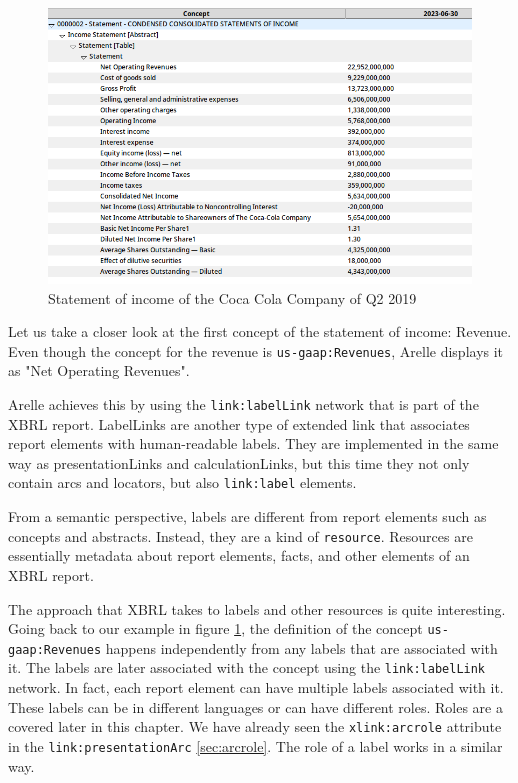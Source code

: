 \begin{figure}[H]
    \centering
    \includegraphics[width=\textwidth]{images/coca_cola_2019_q2.png}
    \caption{Statement of income of the Coca Cola Company of Q2 2019}
    \label{fig:coca_cola_2019_q2}
\end{figure}

Let us take a closer look at the first concept of the statement of income: Revenue.
Even though the concept for the revenue is \texttt{us-gaap:Revenues}, Arelle displays it as "Net Operating Revenues".

Arelle achieves this by using the \texttt{link:labelLink} network that is part of the XBRL report. 
LabelLinks are another type of extended link that associates report elements with human-readable labels.
They are implemented in the same way as presentationLinks and calculationLinks, but this time they not only contain arcs and locators, but also \texttt{link:label} elements.

From a semantic perspective, labels are different from report elements such as concepts and abstracts.
Instead, they are a kind of \texttt{resource}.
Resources are essentially metadata about report elements, facts, and other elements of an XBRL report.

The approach that XBRL takes to labels and other resources is quite interesting.
Going back to our example in figure \ref{fig:coca_cola_2019_q2}, the definition of the concept \texttt{us-gaap:Revenues} happens independently from any labels that are associated with it.
The labels are later associated with the concept using the \texttt{link:labelLink} network.
In fact, each report element can have multiple labels associated with it.
These labels can be in different languages or can have different roles.
Roles are a covered later in this chapter.
We have already seen the \texttt{xlink:arcrole} attribute in the \texttt{link:presentationArc} \ref{sec:arcrole}.
The role of a label works in a similar way.

